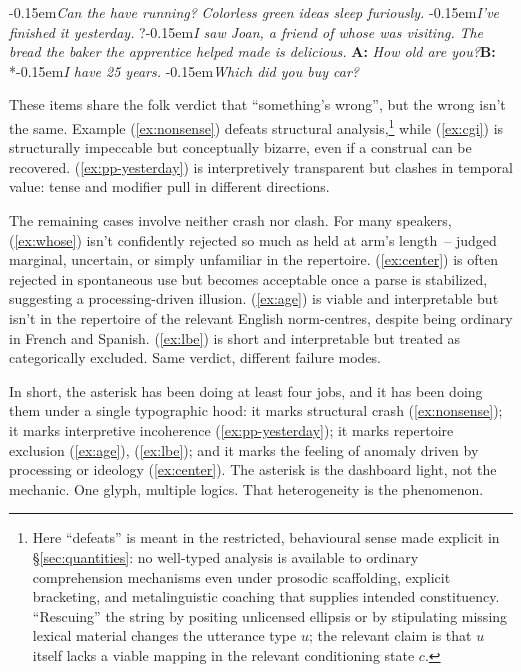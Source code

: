 \documentclass[12pt,letterpaper]{article}
\newcommand{\mention}[1]{\textit{#1}}
\newcommand{\judgesep}{\kern-0.15em}
\newcommand{\ungram}[1]{*\judgesep#1}
\newcommand{\marg}[1]{?\judgesep#1}
\begin{document}
\ea \label{ex:cluster}
\ea \ungram{\mention{Can the have running?}}\label{ex:nonsense}
\ex \mention{Colorless green ideas sleep furiously.}\label{ex:cgi} \autocite{chomsky1957}
\ex \ungram{\mention{I've finished it yesterday.}}\label{ex:pp-yesterday}
\ex \marg{\mention{I saw Joan, a friend of whose was visiting.}}\label{ex:whose}
\ex \mention{The bread the baker the apprentice helped made is delicious.}\label{ex:center}
\ex \textbf{A:} \mention{How old are you?}\quad \textbf{B:} \ungram{\mention{I have 25 years.}}\label{ex:age}
\ex \ungram{\mention{Which did you buy car?}}\label{ex:lbe}
\z\z

These items share the folk verdict that \enquote{something's wrong}, but the wrong isn't the same. Example (\ref{ex:nonsense}) defeats structural analysis,\footnote{Here \enquote{defeats} is meant in the restricted, behavioural sense made explicit in \S\ref{sec:quantities}: no well-typed analysis is available to ordinary comprehension mechanisms even under prosodic scaffolding, explicit bracketing, and metalinguistic coaching that supplies intended constituency. \enquote{Rescuing} the string by positing unlicensed ellipsis or by stipulating missing lexical material changes the utterance type $u$; the relevant claim is that $u$ itself lacks a viable mapping in the relevant conditioning state $c$.} while (\ref{ex:cgi}) is structurally impeccable but conceptually bizarre, even if a construal can be recovered. (\ref{ex:pp-yesterday}) is interpretively transparent but clashes in temporal value: tense and modifier pull in different directions.

The remaining cases involve neither crash nor clash. For many speakers, (\ref{ex:whose}) isn't confidently rejected so much as held at arm's length~-- judged marginal, uncertain, or simply unfamiliar in the repertoire. (\ref{ex:center}) is often rejected in spontaneous use but becomes acceptable once a parse is stabilized, suggesting a processing-driven illusion. (\ref{ex:age}) is viable and interpretable but isn't in the repertoire of the relevant English norm-centres, despite being ordinary in French and Spanish. (\ref{ex:lbe}) is short and interpretable but treated as categorically excluded. Same verdict, different failure modes.


In short, the asterisk has been doing at least four jobs, and it has been doing them under a single typographic hood: it marks structural crash (\ref{ex:nonsense}); it marks interpretive incoherence (\ref{ex:pp-yesterday}); it marks repertoire exclusion (\ref{ex:age}), (\ref{ex:lbe}); and it marks the feeling of anomaly driven by processing or ideology (\ref{ex:center}). The asterisk is the dashboard light, not the mechanic. One glyph, multiple logics. That heterogeneity is the phenomenon.
\end{document}
